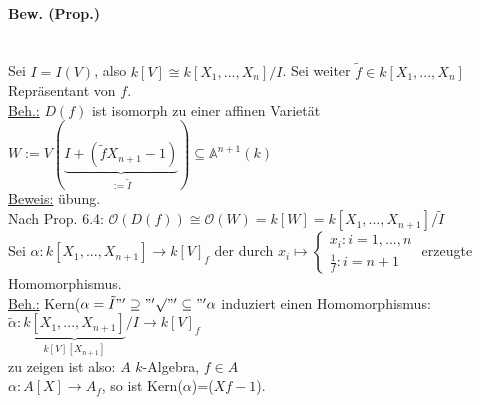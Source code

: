 \documentclass[a4paper,12pt]{report}
\theoremstyle{break}
\theoremstyle{nonumberbreak}
\theoremstyle{nonumberplain}
\begin{document}
\paragraph{Bew. (Prop.)}~\\
Sei $I=I(V)$, also $k[V]\cong k[X_1,...,X_n]/I$. Sei weiter $\tilde{f}\in k[X_1,...,X_n]$ Repräsentant von $f$.\\
\underline{Beh.:} $D(f)$ ist isomorph zu einer affinen Varietät $W:=V(\underbrace{I+(\tilde{f}X_{n+1}-1)}_{:=\tilde{I}})\subseteq \mathbb{A}^{n+1}(k)$\\
\underline{Beweis:} übung.\\
Nach Prop. 6.4: $\mathcal{O}(D(f))\cong\mathcal{O}(W)=k[W]=k[X_1,...,X_{n+1}]/\tilde{I}$\\
Sei $\alpha: k[X_1,...,X_{n+1}] \rightarrow k[V]_f$ der durch $x_i\mapsto\begin{cases}
x_i: i=1,...,n\\
\frac{1}{f}: i=n+1
\end{cases}$ erzeugte Homomorphismus.\\
\underline{Beh.:} Kern($\alpha=\tilde{I}\\
"'\supseteq"' \surd\\
"'\subseteq"' \alpha$ induziert einen Homomorphismus: $\tilde{\alpha}:\underbrace{k[X_1,...,X_{n+1}]}_{k[V][X_{n+1}]}/I\rightarrow k[V]_f$\\
zu zeigen ist also: $A$ $k$-Algebra, $f\in A$\\
$\alpha: A[X]\rightarrow A_f$, so ist Kern($\alpha$)=($Xf-1$).

\appendix

\def\indexspace{\par\medskip}
\end{document}
